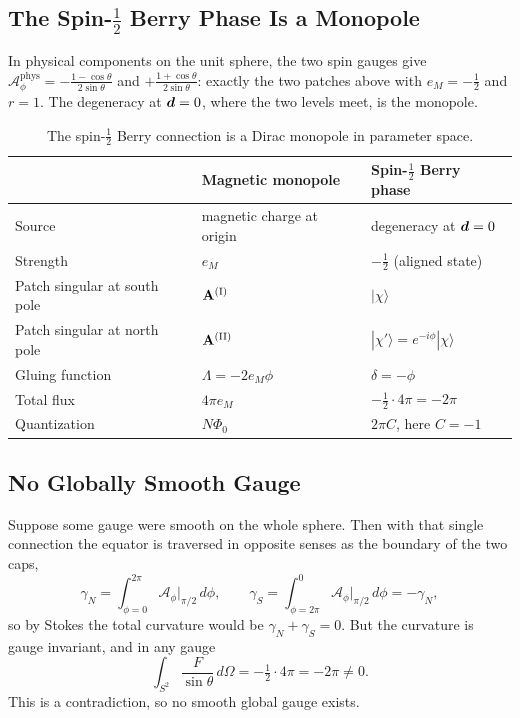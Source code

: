 \subsection{The Spin-\texorpdfstring{$\tfrac12$}{1/2} Berry Phase Is a Monopole}

In physical components on the unit sphere, the two spin gauges give $\mathcal{A}^{\text{phys}}_\phi = -\frac{1-\cos\theta}{2\sin\theta}$ and $+\frac{1+\cos\theta}{2\sin\theta}$: exactly the two patches above with $e_M = -\frac12$ and $r = 1$. The degeneracy at $\bm{d} = 0$, where the two levels meet, is the monopole.

\begin{table}[ht]
\centering
\renewcommand{\arraystretch}{1.3}
\begin{tabular}{@{}lll@{}}
    \toprule
    & Magnetic monopole & Spin-$\frac12$ Berry phase\\
    \midrule
    Source & magnetic charge at origin & degeneracy at $\bm{d} = 0$\\
    Strength & $e_M$ & $-\frac12$ (aligned state)\\
    Patch singular at south pole & $\cvect{A}^{(\mathrm{I})}$ & $|\chi\rangle$\\
    Patch singular at north pole & $\cvect{A}^{(\mathrm{II})}$ & $|\chi'\rangle = e^{-i\phi}|\chi\rangle$\\
    Gluing function & $\Lambda = -2e_M\phi$ & $\delta = -\phi$\\
    Total flux & $4\pi e_M$ & $-\frac12\cdot4\pi = -2\pi$\\
    Quantization & $N\Phi_0$ & $2\pi C$, here $C = -1$\\
    \bottomrule
\end{tabular}
\caption{The spin-$\frac12$ Berry connection is a Dirac monopole in parameter space.}
\end{table}

\subsection{No Globally Smooth Gauge}
\label{sec:no-smooth-gauge}

Suppose some gauge were smooth on the whole sphere. Then with that single connection the equator is traversed in opposite senses as the boundary of the two caps,
\[
    \gamma_N = \int_{\phi=0}^{2\pi}\mathcal{A}_\phi\big|_{\pi/2}\,d\phi,
    \qquad
    \gamma_S = \int_{\phi=2\pi}^{0}\mathcal{A}_\phi\big|_{\pi/2}\,d\phi = -\gamma_N,
\]
so by Stokes the total curvature would be $\gamma_N + \gamma_S = 0$. But the curvature is gauge invariant, and in any gauge
\[
    \int_{S^2}\frac{F}{\sin\theta}\,d\Omega = -\tfrac12\cdot4\pi = -2\pi\neq0 .
\]
This is a contradiction, so no smooth global gauge exists.

